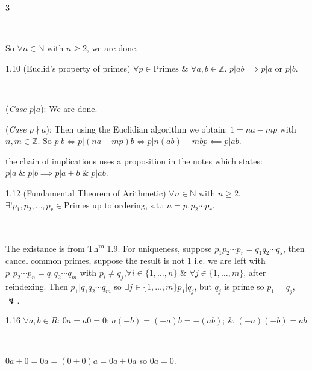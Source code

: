 \documentclass[8pt]{extarticle}
\makeatletter
\renewenvironment{proof}[1][\proofname]{%
  \begin{tcolorbox}[proofpairboxstyle]%
  \pushQED{\qed}%
  \normalfont\itshape #1\@addpunct{.}\ \normalfont\ignorespaces
}{%
  \popQED%
  \end{tcolorbox}%
}
\makeatother
\begin{document}
\begin{multicols*}{3}
\begin{proof}
            So \(\forall n\in\mathbb{N}\) with \(n\ge2\), we are done.

        \end{proof}

        \begin{theorem}{1.10}
            (Euclid's property of primes) \(\forall p\in \text{Primes}\) \& \(\forall a,b\in\mathbb{Z}\). \(p|ab\implies p|a\text{ or } p|b\).
        \end{theorem}

        \begin{proof}
            (\textit{Case \(p|a\)}): We are done.

            (\textit{Case \(p\nmid a\)}): Then using the Euclidian algorithm we obtain: \(1=na-mp\) with \(n,m\in\mathbb{Z}\).
            So \(p|b\Longleftrightarrow p|(na-mp)b\Longleftrightarrow p|n(ab)-mbp\impliedby p|ab\).
        \end{proof}

        {\footnotesize the chain of implications uses a proposition in the notes which states: \(p|a\;\&\;p|b\implies p|a+b\;\&\;p|ab\)}.

        \begin{theorem}{1.12}
            (Fundamental Theorem of Arithmetic) \(\forall n\in\mathbb{N}\) with \(n\ge2\), \(\exists! p_1,p_2,\ldots,p_r\in\text{Primes}\) up to ordering, s.t.: \(n=p_1p_2\cdots p_r\).
        \end{theorem}

        \begin{proof}
            The existance is from Th\textsuperscript{m} 1.9. For uniqueness, suppose \(p_1p_2\cdots p_r=q_1q_2\cdots q_s\), then cancel common primes, suppose the result is not \(1\) i.e. we are left with \(p_1p_2\cdots p_n=q_1q_2\cdots q_m\) with \(p_i\ne q_j\),\(\forall i\in\{1,\ldots,n\}\) \& \(\forall j\in\{1,\ldots,m\}\), after reindexing. Then \(p_1|q_1q_2\cdots q_m\) so \(\exists j\in\{1,\ldots,m\}\)\(p_1|q_j\), but \(q_j\) is prime so \(p_1=q_j\), \(\lightning\).
        \end{proof}

        \begin{lemma}{1.16}
            \(\forall a,b\in R\): \(0a=a0=0\); \(a(-b)=(-a)b=-(ab)\); \& \((-a)(-b)=ab\)
        \end{lemma}

        \begin{proof}
            \(0a+0=0a=(0+0)a=0a+0a\) so \(0a=0\).
            

\end{proof}
\end{multicols*}
\end{document}
